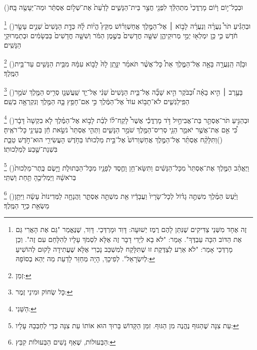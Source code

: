 \documentclass[12pt, openany]{book}
\newcommand{\footnotecomment}[1]{
	\renewcommand\thefootnote{}
	\footnote{\textsf{#1}}}
\newcommand{\commenta}[1]{\footnotecomment{#1}\hspace{0em}}
\newcommand{\vsnum}[1]{(\hebrewnumeral{#1})\space}
\begin{document}
\begin{multicols}{2}
\vsnum{11}וּבְכָל־י֣וֹם וָי֔וֹם מָרְדֳּכַי֙ מִתְהַלֵּ֔ךְ לִפְנֵ֖י חֲצַ֣ר בֵּית־הַנָּשִׁ֑ים לָדַ֙עַת֙ אֶת־שְׁל֣וֹם אֶסְתֵּ֔ר וּמַה־יֵּעָשֶׂ֖ה בָּֽהּ׃%
\commenta{ זֶה אֶחָד מִשְּׁנֵי צַדִּיקִים שֶׁנִּתַּן לָהֶם רֶמֶז יְשׁוּעָה: דָּוִד וּמָרְדְּכַי. דָּוִד, שֶׁנֶּאֱמַר "גַּם אֶת הָאֲרִי גַּם אֶת הַדּוֹב הִכָּה עַבְדֶּךָ". אָמַר: "לֹא בָא לְיָדִי דָבָר זֶה אֶלָּא לִסְמֹךְ עָלָיו לְהִלָּחֵם עִם זֶה". וְכֵן מָרְדְּכַי אָמַר: "לֹא אֵרַע לְצַדֶּקֶת זוּ שֶׁתִּלָּקַח לְמִשְׁכַּב נָכְרִי אֶלָּא שֶׁעֲתִידָה לָקוּם לְהוֹשִׁיעַ לְיִשְׂרָאֵל". לְפִיכָךְ, הָיָה מְחַזֵּר לָדַעַת מַה יְּהֵא בְסוֹפָהּ: }%
\vsnum{12}וּבְהַגִּ֡יעַ תֹּר֩ נַעֲרָ֨ה וְנַעֲרָ֜ה לָב֣וֹא ׀ אֶל־הַמֶּ֣לֶךְ אֲחַשְׁוֵר֗וֹשׁ מִקֵּץ֩ הֱי֨וֹת לָ֜הּ כְּדָ֤ת הַנָּשִׁים֙ שְׁנֵ֣ים עָשָׂ֣ר חֹ֔דֶשׁ כִּ֛י כֵּ֥ן יִמְלְא֖וּ יְמֵ֣י מְרוּקֵיהֶ֑ן שִׁשָּׁ֤ה חֳדָשִׁים֙ בְּשֶׁ֣מֶן הַמֹּ֔ר וְשִׁשָּׁ֤ה חֳדָשִׁים֙ בַּבְּשָׂמִ֔ים וּבְתַמְרוּקֵ֖י הַנָּשִֽׁים׃%
\commenta{ זְמַן:}%
\vsnum{13}וּבָזֶ֕ה הַֽנַּעֲרָ֖ה בָּאָ֣ה אֶל־הַמֶּ֑לֶךְ אֵת֩ כָּל־אֲשֶׁ֨ר תֹּאמַ֜ר יִנָּ֤תֵֽן לָהּ֙ לָב֣וֹא עִמָּ֔הּ מִבֵּ֥ית הַנָּשִׁ֖ים עַד־בֵּ֥ית הַמֶּֽלֶךְ׃%
\commenta{ כָּל שְׂחוֹק וּמִינֵי זֶמֶר:}%
\vsnum{14}בָּעֶ֣רֶב ׀ הִ֣יא בָאָ֗ה וּ֠בַבֹּקֶר הִ֣יא שָׁבָ֞ה אֶל־בֵּ֤ית הַנָּשִׁים֙ שֵׁנִ֔י אֶל־יַ֧ד שַֽׁעֲשְׁגַ֛ז סְרִ֥יס הַמֶּ֖לֶךְ שֹׁמֵ֣ר הַפִּֽילַגְשִׁ֑ים לֹא־תָב֥וֹא עוֹד֙ אֶל־הַמֶּ֔לֶךְ כִּ֣י אִם־חָפֵ֥ץ בָּ֛הּ הַמֶּ֖לֶךְ וְנִקְרְאָ֥ה בְשֵֽׁם׃%
\commenta{ הַשֵּׁנִי:}%
\vsnum{15}וּבְהַגִּ֣יעַ תֹּר־אֶסְתֵּ֣ר בַּת־אֲבִיחַ֣יִל דֹּ֣ד מָרְדֳּכַ֡י אֲשֶׁר֩ לָקַֽח־ל֨וֹ לְבַ֜ת לָב֣וֹא אֶל־הַמֶּ֗לֶךְ לֹ֤א בִקְשָׁה֙ דָּבָ֔ר כִּ֠י אִ֣ם אֶת־אֲשֶׁ֥ר יֹאמַ֛ר הֵגַ֥י סְרִיס־הַמֶּ֖לֶךְ שֹׁמֵ֣ר הַנָּשִׁ֑ים וַתְּהִ֤י אֶסְתֵּר֙ נֹשֵׂ֣את חֵ֔ן בְּעֵינֵ֖י כָּל־רֹאֶֽיהָ׃
\vsnum{16}וַתִּלָּקַ֨ח אֶסְתֵּ֜ר אֶל־הַמֶּ֤לֶךְ אֲחַשְׁוֵרוֹשׁ֙ אֶל־בֵּ֣ית מַלְכוּת֔וֹ בַּחֹ֥דֶשׁ הָעֲשִׂירִ֖י הוּא־חֹ֣דֶשׁ טֵבֵ֑ת בִּשְׁנַת־שֶׁ֖בַע לְמַלְכוּתֽוֹ׃%
\commenta{ עֵת צִנָּה שֶׁהַגּוּף נֶהֱנֶה מִן הַגּוּף. זִמֵּן הַקָּדוֹשׁ בָּרוּךְ הוּא אוֹתוֹ עֵת צִנָּה כְּדֵי לְחַבְּבָהּ עָלָיו:}%
\vsnum{17}וַיֶּאֱהַ֨ב הַמֶּ֤לֶךְ אֶת־אֶסְתֵּר֙ מִכָּל־הַנָּשִׁ֔ים וַתִּשָּׂא־חֵ֥ן וָחֶ֛סֶד לְפָנָ֖יו מִכָּל־הַבְּתוּלֹ֑ת וַיָּ֤שֶׂם כֶּֽתֶר־מַלְכוּת֙ בְּרֹאשָׁ֔הּ וַיַּמְלִיכֶ֖הָ תַּ֥חַת וַשְׁתִּֽי׃%
\commenta{ הַבְּעוּלוֹת, שֶׁאַף נָשִׁים הַבְּעוּלוֹת קִבֵּץ: }%
\vsnum{18}וַיַּ֨עַשׂ הַמֶּ֜לֶךְ מִשְׁתֶּ֣ה גָד֗וֹל לְכָל־שָׂרָיו֙ וַעֲבָדָ֔יו אֵ֖ת מִשְׁתֵּ֣ה אֶסְתֵּ֑ר וַהֲנָחָ֤ה לַמְּדִינוֹת֙ עָשָׂ֔ה וַיִּתֵּ֥ן מַשְׂאֵ֖ת כְּיַ֥ד הַמֶּֽלֶךְ׃%

\end{multicols}
\end{document}
